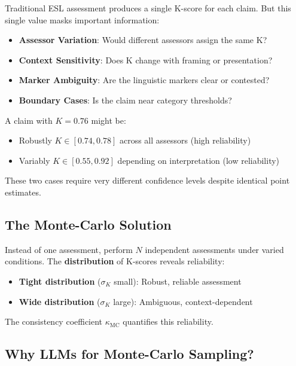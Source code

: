 \documentclass[11pt,a4paper]{article}
\theoremstyle{remark}
\begin{document}
Traditional ESL assessment produces a single K-score for each claim. But this single value masks important information:

\begin{itemize}
    \item \textbf{Assessor Variation}: Would different assessors assign the same K?
    \item \textbf{Context Sensitivity}: Does K change with framing or presentation?
    \item \textbf{Marker Ambiguity}: Are the linguistic markers clear or contested?
    \item \textbf{Boundary Cases}: Is the claim near category thresholds?
\end{itemize}

A claim with $K = 0.76$ might be:
\begin{itemize}
    \item Robustly $K \in [0.74, 0.78]$ across all assessors (high reliability)
    \item Variably $K \in [0.55, 0.92]$ depending on interpretation (low reliability)
\end{itemize}

These two cases require very different confidence levels despite identical point estimates.

\subsection{The Monte-Carlo Solution}

\begin{keyinsight}[title={Core Idea of ESL 2.1}]
Instead of one assessment, perform $N$ independent assessments under varied conditions. The \textbf{distribution} of K-scores reveals reliability:
\begin{itemize}
    \item \textbf{Tight distribution} ($\sigma_K$ small): Robust, reliable assessment
    \item \textbf{Wide distribution} ($\sigma_K$ large): Ambiguous, context-dependent
\end{itemize}

The consistency coefficient $\kappa_{\text{MC}}$ quantifies this reliability.
\end{keyinsight}

\subsection{Why LLMs for Monte-Carlo Sampling?}
\end{document}
